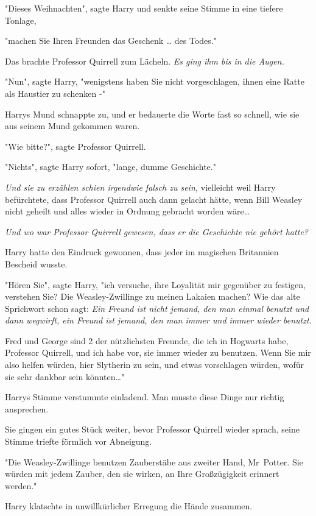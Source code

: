 {"Dieses Weihnachten", sagte Harry und senkte seine Stimme in eine tiefere Tonlage,

"machen Sie Ihren Freunden das Geschenk … des Todes."

Das brachte Professor Quirrell zum Lächeln. \emph{Es ging ihm bis in die Augen.}

"Nun", sagte Harry, "wenigstens haben Sie nicht vorgeschlagen, ihnen eine Ratte als Haustier zu schenken -"

Harrys Mund schnappte zu, und er bedauerte die Worte fast so schnell, wie sie aus seinem Mund gekommen waren.

"Wie bitte?", sagte Professor Quirrell.

"Nichts", sagte Harry sofort, "lange, dumme Geschichte."

\emph{Und sie zu erzählen schien irgendwie falsch zu sein,} vielleicht weil Harry befürchtete, dass Professor Quirrell auch dann gelacht hätte, wenn Bill Weasley nicht geheilt und alles wieder in Ordnung gebracht worden wäre…

\emph{Und wo war Professor Quirrell gewesen, dass er die Geschichte nie gehört hatte?}

Harry hatte den Eindruck gewonnen, dass jeder im magischen Britannien Bescheid wusste.

"Hören Sie", sagte Harry, "ich versuche, ihre Loyalität mir gegenüber zu festigen, verstehen Sie? Die Weasley-Zwillinge zu meinen Lakaien machen? Wie das alte Sprichwort schon sagt: \emph{Ein Freund ist nicht jemand, den man einmal benutzt und dann wegwirft, ein Freund ist jemand, den man immer und immer wieder benutzt.}

Fred und George sind 2 der nützlichsten Freunde, die ich in Hogwarts habe, Professor Quirrell, und ich habe vor, sie immer wieder zu benutzen. Wenn Sie mir also helfen würden, hier Slytherin zu sein, und etwas vorschlagen würden, wofür sie sehr dankbar sein könnten…"

Harrys Stimme verstummte einladend. Man musste diese Dinge nur richtig ansprechen.

Sie gingen ein gutes Stück weiter, bevor Professor Quirrell wieder sprach, seine Stimme triefte förmlich vor Abneigung.

"Die Weasley-Zwillinge benutzen Zauberstäbe aus zweiter Hand, Mr~Potter. Sie würden mit jedem Zauber, den sie wirken, an Ihre Großzügigkeit erinnert werden."

Harry klatschte in unwillkürlicher Erregung die Hände zusammen.

}
